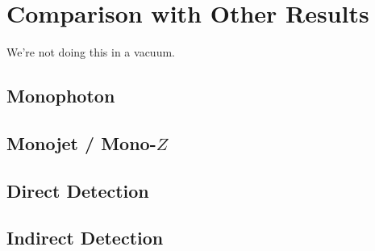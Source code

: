 \chapter{Comparison with Other Results}

We're not doing this in a vacuum.

\section{Monophoton}

\section{Monojet / Mono-$Z$}

\section{Direct Detection}

\section{Indirect Detection}
